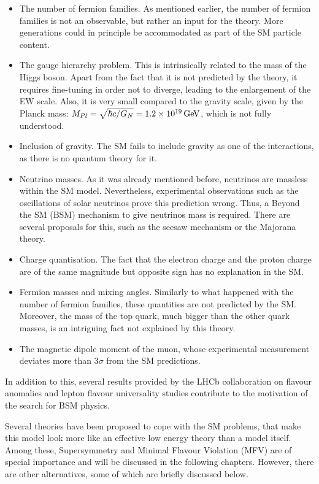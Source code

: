 \begin{itemize} 
\item The number of fermion families. As mentioned earlier, the number of fermion families is not an observable, but rather an input for the theory. More generations could in principle be accommodated as part of the SM particle content. 
\item The gauge hierarchy problem. This is intrinsically related to the mass of the Higgs boson. Apart from the fact that it is not predicted by the theory, it requires fine-tuning in order not to diverge, leading to the enlargement of the EW scale. Also, it is very small compared to the gravity scale, given by the Planck mass: $M_{Pl} = \sqrt{\hbar c/G_N} = 1.2 \times 10^{19} \mathrm{\,Ge\kern -0.1em V}$, which is not fully understood. 
\item Inclusion of gravity. The SM fails to include gravity as one of the interactions, as there is no quantum theory for it. 
\item Neutrino masses. As it was already mentioned before, neutrinos are massless within the SM model. Nevertheless, experimental observations such as the oscillations of solar neutrinos prove this prediction wrong. Thus, a Beyond the SM (BSM) mechanism to give neutrinos mass is required. There are several proposals for this, such as the seesaw mechanism or the Majorana theory. 
\item Charge quantisation. The fact that the electron charge and the proton charge are of the same magnitude but opposite sign has no explanation in the SM. 
\item Fermion masses and mixing angles. Similarly to what happened with the number of fermion families, these quantities are not predicted by the SM. Moreover, the mass of the top quark, much bigger than the other quark masses, is an intriguing fact not explained by this theory. 
\item The magnetic dipole moment of the muon, whose experimental measurement deviates more than 3$\sigma$ from the SM predictions. 
\end{itemize}

In addition to this, several results provided by the LHCb collaboration  on flavour anomalies and lepton flavour universality studies contribute to the motivation of the search for BSM physics. 

Several theories have been proposed to cope with the SM problems, that make this model look more like an effective low energy theory than a model itself. Among these, Supersymmetry and Minimal Flavour Violation (MFV) are of special importance and will be discussed in the following chapters. However, there are other alternatives, some of which are briefly discussed below.

